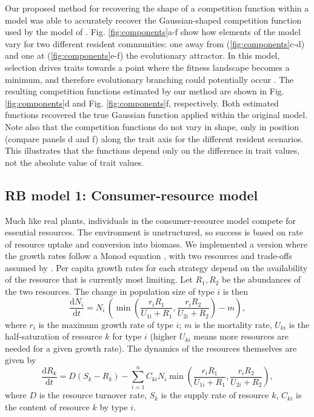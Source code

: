 \documentclass[a4paper,11pt]{article}
\newcommand{\ud}{\ensuremath{\mathrm{d}}}
\begin{document}
Our proposed method for recovering the shape of a competition function within a model was able to accurately recover the Gaussian-shaped competition function used by the model of \citet{Dieckmann-1999}. Fig. \ref{fig:components}a-f show how elements of the model vary for two different resident communities: one away from (\ref{fig:components}c-d) and one at (\ref{fig:components}e-f) the evolutionary attractor. In this model, selection drives traits towards a point where the fitness landscape becomes a minimum, and therefore evolutionary branching could potentially occur \citet{Dieckmann-1999}. The resulting competition functions estimated by our method are shown in Fig. \ref{fig:components}d and Fig. \ref{fig:components}f, respectively. Both estimated functions recovered the true Gaussian function applied within the original model. Note also that the competition functions do not vary in shape, only in position (compare panels d and f) along the trait axis for the different resident scenarios. This illustrates that the functions depend only on the difference in trait values, not the absolute value of trait values.

\subsection{RB model 1: Consumer-resource model}

Much like real plants, individuals in the consumer-resource model compete for essential resources. The environment is unstructured, so success is based on rate of resource uptake and conversion into biomass. We implemented a version where the growth rates follow a Monod equation \citep{Huisman-2001}, with two resources and trade-offs assumed by \citet{Fox-2008}. Per capita growth rates for each strategy depend on the availability of the resource that is currently most limiting. Let $R_1, R_2$ be the abundances of the two resources. The change in population size of type $i$ is then
\begin{equation}
 \label{eq:rstar-n}
 \frac{\ud N_i}{\ud t} = N_i \, \left(\min\left(\frac{r_i R_1}{U_{1i} + R_1}, \frac{r_i R_2}{U_{2i} + R_2}\right) - m\right),
\end{equation}
where $r_i$ is the maximum growth rate of type $i$; $m$ is the mortality rate, $U_{ki}$ is the half-saturation of resource $k$ for type $i$ (higher $U_{ki}$ means more resources are needed for a given growth rate). The dynamics of the resources themselves are given by
\begin{equation}
 \label{eq:rstar-r}
 \frac{\ud R_k}{\ud t} =
 D (S_k - R_k) - \sum_{i=1}^n {C_{ki} N_i
 \min\left(\frac{r_i R_1}{U_{1i} + R_1}, \frac{r_i R_2}{U_{2i} + R_2}\right)},
\end{equation}
where $D$ is the resource turnover rate, $S_k$ is the supply rate of resource $k$, 
$C_{ki}$ is the content of resource $k$ by type $i$.
\end{document}
